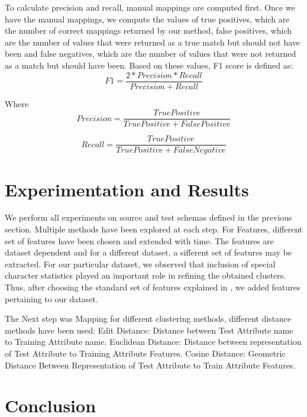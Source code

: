 \documentclass[conference]{IEEEtran}
\begin{document}
To calculate precision and recall, manual mappings are computed first. Once we have the manual mappings, we compute the values of true positives, which are the number of correct mappings returned by our method, false positives, which are the number of values that were returned as a true match but should not have been and false negatives, which are the number of values that were not returned as a match but should have been. Based on these values, F1 score is defined as: 
\begin{equation}
F1 = \frac{2 * Precision * Recall}{Precision + Recall}
\end{equation}

\noindent
Where
\begin{equation}
Precision = \frac{True Positive}{True Positive + False Positive}
\end{equation}

\begin{equation}
Recall = \frac{True Positive}{True Positive + False Negative}
\end{equation}
    
\section{Experimentation and Results}
We perform all experiments on source and test schemas defined in the previous section. Multiple methods have been explored at each step. For Features, different set of features have been chosen and extended with time. The features are dataset dependent and for a different dataset, a sifferent set of features may be extracted. For our particular dataset, we observed that inclusion of special character statistics played an important role in refining the obtained clusters. Thus, after choosing the standard set of features explained in \cite{ref1}, we added features pertaining to our dataset.

The Next step was Mapping for different clustering methods, different distance methods have been used:
Edit Distance: Distance between Test Attribute name to Training Attribute name.
Euclidean Distance: Distance between representation of Test Attribute to Training Attribute Features.
Cosine Distance: Geometric Distance Between Representation of Test Attribute to Train Attribute Features. 

\section{Conclusion}
\end{document}
